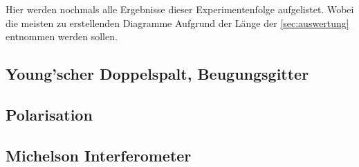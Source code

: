 \documentclass[12pt,english,ngerman]{scrartcl}
\begin{document}
Hier werden nochmals alle Ergebnisse dieser Experimentenfolge aufgelistet.
Wobei die meisten zu erstellenden Diagramme Aufgrund der Länge der
\autoref{sec:auswertung} entnommen werden sollen.

\subsection{Young'scher Doppelspalt, Beugungsgitter}


\subsection{Polarisation}


\subsection{Michelson Interferometer}


\newpage
\printbibliography
\listoffigures
\listoftables
\end{document}
